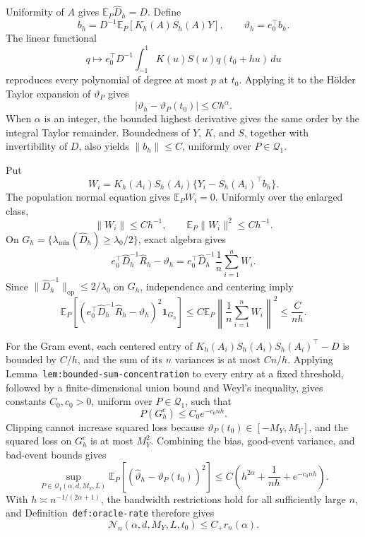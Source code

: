 Uniformity of \(A\) gives \(\mathbb E_P\widehat D_h=D\). Define
\[
b_h=D^{-1}\mathbb E_P[K_h(A)S_h(A)Y],
\qquad
\vartheta_h=e_0^\top b_h.
\]
The linear functional
\[
q\longmapsto e_0^\top D^{-1}
\int_{-1}^1K(u)S(u)q(t_0+hu)\,du
\]
reproduces every polynomial of degree at most \(p\) at \(t_0\). Applying it to the H\"older Taylor expansion of \(\vartheta_P\) gives
\[
\lvert\vartheta_h-\vartheta_P(t_0)\rvert\le Ch^\alpha.
\]
When \(\alpha\) is an integer, the bounded highest derivative gives the same order by the integral Taylor remainder. Boundedness of \(Y\), \(K\), and \(S\), together with invertibility of \(D\), also yields \(\lVert b_h\rVert\le C\), uniformly over \(P\in\mathcal Q_1\).

Put
\[
W_i=K_h(A_i)S_h(A_i)\{Y_i-S_h(A_i)^\top b_h\}.
\]
The population normal equation gives \(\mathbb E_PW_i=0\). Uniformly over the enlarged class,
\[
\lVert W_i\rVert\le Ch^{-1},
\qquad
\mathbb E_P\lVert W_i\rVert^2\le Ch^{-1}.
\]
On \(G_h=\{\lambda_{\min}(\widehat D_h)\ge\lambda_0/2\}\), exact algebra gives
\[
e_0^\top\widehat D_h^{-1}\widehat R_h-\vartheta_h
=e_0^\top\widehat D_h^{-1}\frac1n\sum_{i=1}^nW_i.
\]
Since \(\lVert\widehat D_h^{-1}\rVert_{\mathrm{op}}\le2/\lambda_0\) on \(G_h\), independence and centering imply
\[
\mathbb E_P\left[
\left(e_0^\top\widehat D_h^{-1}\widehat R_h-\vartheta_h\right)^2
\mathbf 1_{G_h}
\right]
\le
C\mathbb E_P\left\lVert\frac1n\sum_{i=1}^nW_i\right\rVert^2
\le\frac{C}{nh}.
\]

For the Gram event, each centered entry of
\(K_h(A_i)S_h(A_i)S_h(A_i)^\top-D\) is bounded by \(C/h\), and the sum of its \(n\) variances is at most \(Cn/h\). Applying Lemma~\texttt{lem:bounded-sum-concentration} to every entry at a fixed threshold, followed by a finite-dimensional union bound and Weyl's inequality, gives constants \(C_0,c_0>0\), uniform over \(P\in\mathcal Q_1\), such that
\[
P(G_h^c)\le C_0e^{-c_0nh}.
\]
Clipping cannot increase squared loss because \(\vartheta_P(t_0)\in[-M_Y,M_Y]\), and the squared loss on \(G_h^c\) is at most \(M_Y^2\). Combining the bias, good-event variance, and bad-event bounds gives
\[
\sup_{P\in\mathcal Q_1(\alpha,d,M_Y,L)}
\mathbb E_P[(\widehat\vartheta_h-\vartheta_P(t_0))^2]
\le C\left(h^{2\alpha}+\frac1{nh}+e^{-c_0nh}\right).
\]
With \(h\asymp n^{-1/(2\alpha+1)}\), the bandwidth restrictions hold for all sufficiently large \(n\), and Definition~\texttt{def:oracle-rate} therefore gives
\[
\mathcal N_n(\alpha,d,M_Y,L,t_0)\le C_+r_n(\alpha).
\]

